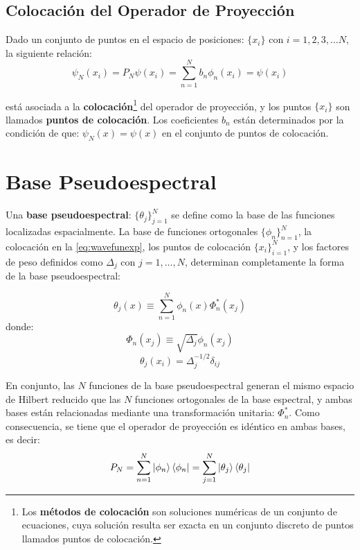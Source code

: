 \subsection{Colocación del Operador de Proyección}
Dado un conjunto de puntos en el espacio de posiciones: $\{x_i\}$ con $i=1,2,3,\dots N$, la siguiente relación:
\begin{equation}
  \label{eq:wavefunexp}
  \psi_N(x_i) = P_N\psi(x_i)=\sum_{n=1}^{N}b_n\phi_n(x_i) = \psi(x_i)
\end{equation}

está asociada a la \textbf{colocación}\footnote{Los \textbf{métodos de colocación} son soluciones numéricas de un conjunto de ecuaciones, cuya solución resulta ser exacta en un conjunto discreto de puntos llamados puntos de colocación.\cite{Tannor:2006}} del operador de proyección, y los puntos $\{x_i\}$ son llamados \textbf{puntos de colocación}. Los coeficientes $b_n$ están determinados por la condición de que: $\psi_N(x)=\psi(x)$ en el conjunto de puntos de colocación.


\section{Base Pseudoespectral}
Una \textbf{base pseudoespectral}: $\{\theta_j\}_{j=1}^N$ se define como la base de las funciones localizadas espacialmente. La base de funciones ortogonales $\{\phi_n\}_{n=1}^N$, la colocación en la \autoref{eq:wavefunexp}, los puntos de colocación $\{x_i\}_{i=1}^N$, y los factores de peso definidos como $\Delta_j$ con $j=1,\dots,N$, determinan completamente la forma de la base pseudoespectral:

\begin{equation}
  \label{eq:basepseudo}
  \theta_j(x) \equiv \sum_{n=1}^N\phi_n(x)\Phi_n^*(x_j)
\end{equation}
donde:
$$\Phi_n(x_j)\equiv \sqrt{\Delta_j}\phi_n(x_j)$$
$$\theta_j(x_i) = \Delta_j^{-1/2}\delta_{ij}$$


En conjunto, las $N$ funciones de la base pseudoespectral generan el mismo espacio de Hilbert reducido que las $N$ funciones ortogonales de la base espectral, y ambas bases están relacionadas mediante una transformación unitaria: $\Phi_n^*$. Como consecuencia, se tiene que el operador de proyección es idéntico en ambas bases, es decir:
\begin{equation}
  \label{eq:proyecbases}
  P_N = \sum_{n=1}^N\ket{\phi_n}\bra{\phi_n}=\sum_{j=1}^N\ket{\theta_j}\bra{\theta_j}
\end{equation}

